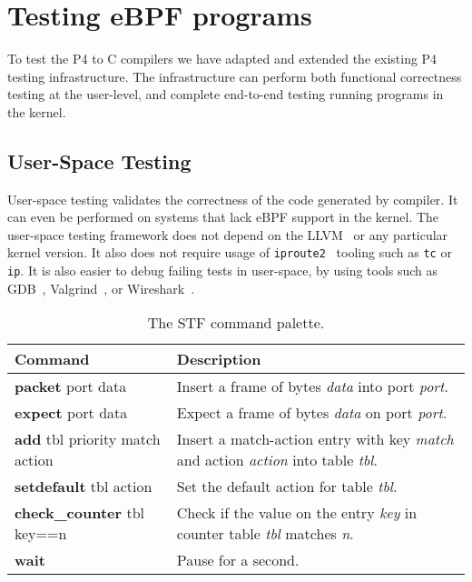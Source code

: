 \section{Testing eBPF programs}\label{sec:testing}

To test the P4 to C compilers we have adapted and extended the
existing P4 testing infrastructure. The infrastructure can perform
both functional correctness testing at the user-level, and complete
end-to-end testing running programs in the kernel.

\subsection{User-Space Testing}

User-space testing validates the correctness of the code generated by
compiler. It can even be performed on systems that lack eBPF support
in the kernel.  The user-space testing framework does not depend on
the LLVM~\cite{llvm} or any particular kernel version.  It also does
not require usage of \texttt{iproute2}~\cite{iproute} tooling such as
\texttt{tc} or \texttt{ip}.  It is also easier to debug failing tests
in user-space, by using tools such as GDB~\cite{gdb},
Valgrind~\cite{valgrind}, or Wireshark~\cite{wireshark}.

\begin{table*}[h]
	\footnotesize
	\begin{center}
		\begin{tabular}{|p{5.8cm}|p{10.3cm}|} \hline
			\textbf{Command} & \textbf{Description} \\ \hline \hline
			\textbf{packet} port data & Insert a frame of bytes
			\textit{data} into port \textit{port}.    \\ \hline
			\textbf{expect} port data & Expect a frame of bytes
			\textit{data} on port \textit{port}.  \\ \hline
			\textbf{add} tbl priority match action & Insert a
			match-action entry with key \textit{match} and action
			\textit{action} into table \textit{tbl}. \\ \hline
			\textbf{setdefault} tbl action & Set the default action for table
			\textit{tbl}. \\
			\hline
			\textbf{check\_counter} tbl key==n & Check if the value on
			the entry \textit{key} in counter table \textit{tbl} matches
			\textit{n}.  \\
			\hline
			\textbf{wait} & Pause for a second. \\ \hline
		\end{tabular}
		\caption{The STF command palette.}\label{table:stf}
	\end{center}
\end{table*}

